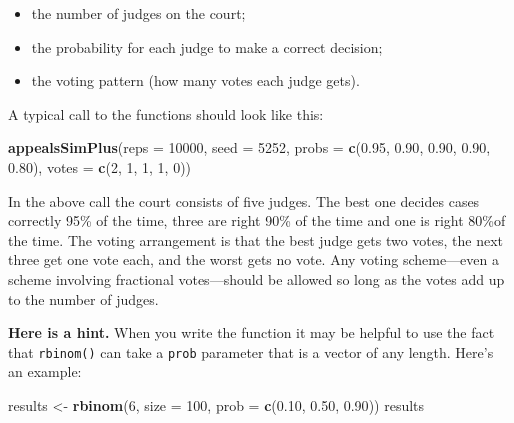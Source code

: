 \documentclass[]{book}
\makeatletter
\newenvironment{Shaded}{\begin{snugshade}}{\end{snugshade}}
\newcommand{\KeywordTok}[1]{\textcolor[rgb]{0.13,0.29,0.53}{\textbf{#1}}}
\newcommand{\DataTypeTok}[1]{\textcolor[rgb]{0.13,0.29,0.53}{#1}}
\newcommand{\DecValTok}[1]{\textcolor[rgb]{0.00,0.00,0.81}{#1}}
\newcommand{\FloatTok}[1]{\textcolor[rgb]{0.00,0.00,0.81}{#1}}
\newcommand{\StringTok}[1]{\textcolor[rgb]{0.31,0.60,0.02}{#1}}
\newcommand{\NormalTok}[1]{#1}
\providecommand{\tightlist}{%
  \setlength{\itemsep}{0pt}\setlength{\parskip}{0pt}}
\newenvironment{kframe}{%
\medskip{}
\setlength{\fboxsep}{.8em}
 \def\at@end@of@kframe{}%
 \ifinner\ifhmode%
  \def\at@end@of@kframe{\end{minipage}}%
  \begin{minipage}{\columnwidth}%
 \fi\fi%
 \def\FrameCommand##1{\hskip\@totalleftmargin \hskip-\fboxsep
 \colorbox{shadecolor}{##1}\hskip-\fboxsep
     \hskip-\linewidth \hskip-\@totalleftmargin \hskip\columnwidth}%
 \MakeFramed {\advance\hsize-\width
   \@totalleftmargin\z@ \linewidth\hsize
   \@setminipage}}%
 {\par\unskip\endMakeFramed%
 \at@end@of@kframe}
\renewenvironment{Shaded}{\begin{kframe}}{\end{kframe}}
\theoremstyle{definition}
\theoremstyle{definition}
\theoremstyle{definition}
\theoremstyle{remark}
\makeatother
\begin{document}
{\begin{enumerate}
  \begin{itemize}
  \tightlist
  \item
    the number of judges on the court;
  \item
    the probability for each judge to make a correct decision;
  \item
    the voting pattern (how many votes each judge gets).
  \end{itemize}

  A typical call to the functions should look like this:

\begin{Shaded}
\begin{Highlighting}[]
\KeywordTok{appealsSimPlus}\NormalTok{(}\DataTypeTok{reps =} \DecValTok{10000}\NormalTok{, }\DataTypeTok{seed =} \DecValTok{5252}\NormalTok{, }
               \DataTypeTok{probs =} \KeywordTok{c}\NormalTok{(}\FloatTok{0.95}\NormalTok{, }\FloatTok{0.90}\NormalTok{, }\FloatTok{0.90}\NormalTok{, }\FloatTok{0.90}\NormalTok{, }\FloatTok{0.80}\NormalTok{),}
               \DataTypeTok{votes =} \KeywordTok{c}\NormalTok{(}\DecValTok{2}\NormalTok{, }\DecValTok{1}\NormalTok{, }\DecValTok{1}\NormalTok{, }\DecValTok{1}\NormalTok{, }\DecValTok{0}\NormalTok{))}
\end{Highlighting}
\end{Shaded}

  In the above call the court consists of five judges. The best one
  decides cases correctly 95\% of the time, three are right 90\% of the
  time and one is right 80\%of the time. The voting arrangement is that
  the best judge gets two votes, the next three get one vote each, and
  the worst gets no vote. Any voting scheme---even a scheme involving
  fractional votes---should be allowed so long as the votes add up to
  the number of judges.

  \textbf{Here is a hint.} When you write the function it may be helpful
  to use the fact that \texttt{rbinom()} can take a \texttt{prob}
  parameter that is a vector of any length. Here's an example:

\begin{Shaded}
\begin{Highlighting}[]
\NormalTok{results <-}\StringTok{ }\KeywordTok{rbinom}\NormalTok{(}\DecValTok{6}\NormalTok{, }\DataTypeTok{size =} \DecValTok{100}\NormalTok{, }\DataTypeTok{prob =} \KeywordTok{c}\NormalTok{(}\FloatTok{0.10}\NormalTok{, }\FloatTok{0.50}\NormalTok{, }\FloatTok{0.90}\NormalTok{))}
\NormalTok{results}
\end{Highlighting}
\end{Shaded}


\end{enumerate}}
\end{document}
